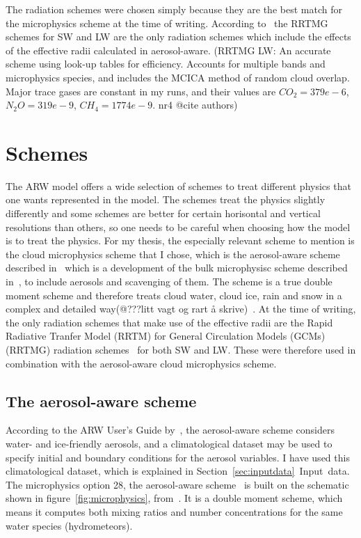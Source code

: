 The radiation schemes were chosen simply because they are the best match for the microphysics scheme at the time of writing. According to~\cite{Thompson2014} the RRTMG schemes for SW and LW are the only radiation schemes which include the effects of the effective radii calculated in aerosol-aware. (RRTMG LW: An accurate scheme using look-up tables for efficiency. Accounts for multiple bands and microphysics species, and includes the MCICA method of random cloud overlap. Major trace gases are constant in my runs, and their values are $CO_2=379e-6$, $N_2O=319e-9$, $CH_4=1774e-9$. nr4 @cite authors)

\section{Schemes}
\label{sec:schemes}
The ARW model offers a wide selection of schemes to treat different physics that one wants represented in the model. The schemes treat the physics slightly differently and some schemes are better for certain horisontal and vertical resolutions than others, so one needs to be careful when choosing how the model is to treat the physics. For my thesis, the especially relevant scheme to mention is the cloud microphysics scheme that I chose, which is the aerosol-aware scheme described in~\cite{Thompson2014} which is a development of the bulk microphysisc scheme described in~\cite{Thompson2008}, to include aerosols and scavenging of them. The scheme is a true double moment scheme and therefore treats cloud water, cloud ice, rain and snow in a complex and detailed way(@???litt vagt og rart å skrive)~\cite{Thompson2014}. At the time of writing, the only radiation schemes that make use of the effective radii are the Rapid Radiative Tranfer Model (RRTM) for General Circulation Models (GCMs) (RRTMG) radiation schemes~\cite{@authorsRRTMG} for both SW and LW. These were therefore used in combination with the aerosol-aware cloud microphysics scheme.

\subsection{The aerosol-aware scheme}
According to the ARW User's Guide by~\cite{Wang2015}, the aerosol-aware scheme considers water- and ice-friendly aerosols, and a climatological dataset may be used to specify initial and boundary conditions for the aerosol variables. I have used this climatological dataset, which is explained in Section~\ref{sec:inputdata}~Input~data.
The microphysics option 28, the aerosol-aware scheme~\citep{Thompson2014} is built on the schematic shown in figure~\ref{fig:microphysics}, from~\cite{Reisner1998}. It is a double moment scheme, which means it computes both mixing ratios and number concentrations for the same water species (hydrometeors). 

